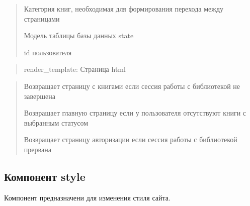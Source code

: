 \documentclass[letterpaper,10pt,russian]{sphinxmanual}
\begin{document}
\begin{fulllineitems}
\begin{description}
\begin{quote}
\begin{description}
\sphinxAtStartPar
Категория книг, необходимая для формирования перехода между страницами

\sphinxAtStartPar
Модель таблицы базы данных state

\sphinxAtStartPar
id пользователя

\end{description}\end{quote}

\end{description}
\begin{quote}\begin{description}
\sphinxAtStartPar
render\_template: Страница html

\end{description}\end{quote}
\begin{description}
\begin{quote}\begin{description}
\sphinxAtStartPar
Возвращает страницу с книгами если сессия работы с библиотекой  не завершена

\sphinxAtStartPar
Возвращает главную страницу если у пользователя отсутствуют книги с выбранным статусом

\sphinxAtStartPar
Возвращает страницу авторизации если сессия работы с библиотекой прервана

\end{description}\end{quote}

\end{description}

\end{fulllineitems}



\subsection{Компонент style}
\label{\detokenize{blueprints:style}}
\begin{DUlineblock}{0em}
\item[] Компонент предназначени для изменения стиля сайта.
\end{DUlineblock}
\label{\detokenize{blueprints:module-blueprints.style}}
\end{document}
